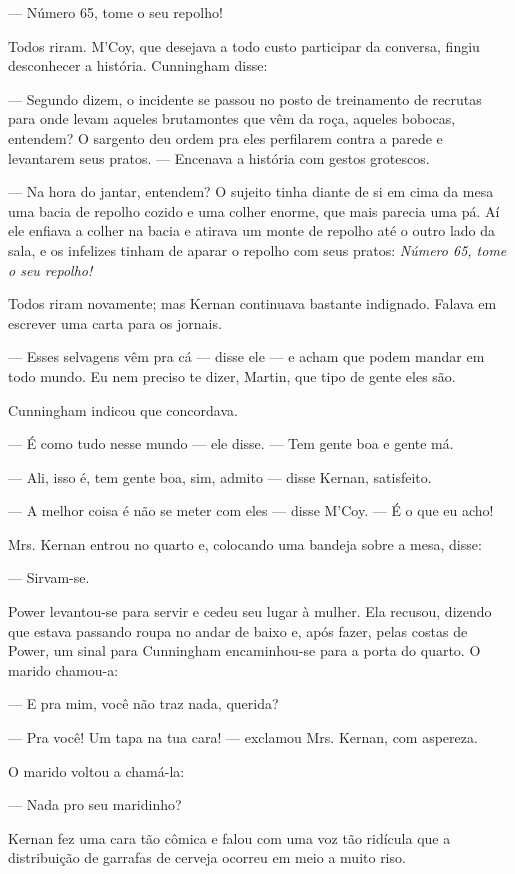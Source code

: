 --- Número 65, tome o seu repolho!

Todos riram. M'Coy, que desejava a todo custo participar da conversa,
fingiu desconhecer a história. Cunningham disse:

--- Segundo dizem, o incidente se passou no posto de treinamento de
recrutas para onde levam aqueles brutamontes que vêm da roça, aqueles
bobocas, entendem? O sargento deu ordem pra eles perfilarem contra
a parede e levantarem seus pratos. --- Encenava a história com
gestos grotescos.

--- Na hora do jantar, entendem? O sujeito tinha diante de si em cima
da mesa uma bacia de repolho cozido e uma colher enorme, que mais
parecia uma pá. Aí ele enfiava a colher na bacia e atirava um monte de
repolho até o outro lado da sala, e os infelizes tinham de aparar o
repolho com seus pratos: \textit{Número 65, tome o seu repolho!}

Todos riram novamente; mas Kernan continuava bastante indignado.
Falava em escrever uma carta para os jornais.

--- Esses selvagens vêm pra cá --- disse ele --- e acham que podem
mandar em todo mundo. Eu nem preciso te dizer, Martin, que tipo de
gente eles são.

Cunningham indicou que concordava.

--- É como tudo nesse mundo --- ele disse. --- Tem gente boa e gente má.

--- Ali, isso é, tem gente boa, sim, admito --- disse Kernan,
satisfeito.

--- A melhor coisa é não se meter com eles --- disse M'Coy. ---
É o que eu acho!

Mrs. Kernan entrou no quarto e, colocando uma bandeja sobre a mesa,
disse:

--- Sirvam-se.

Power levantou-se para servir e cedeu seu lugar à mulher. Ela recusou,
dizendo que estava passando roupa no andar de baixo e, após fazer,
pelas costas de Power, um sinal para Cunningham encaminhou-se para a
porta do quarto. O marido chamou-a:

--- E pra mim, você não traz nada, querida?

--- Pra você! Um tapa na tua cara! --- exclamou Mrs. Kernan, com
aspereza.

O marido voltou a chamá-la:

--- Nada pro seu maridinho?

Kernan fez uma cara tão cômica e falou com uma voz tão ridícula que a
distribuição de garrafas de cerveja ocorreu em meio a muito riso.


